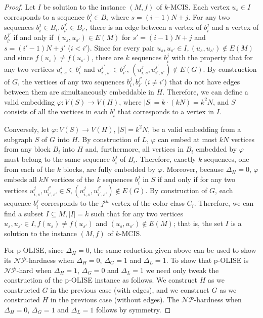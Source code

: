 \documentclass[11pt]{article}
\newcommand{\NP}{\mbox{$\mathcal{NP}$}}
\let\phi=\varphi
\begin{document}
\begin{proof}
Let $I$ be solution to the instance $(M, f)$ of \textsc{$k$-MCIS}. Each vertex $u_s \in I$ corresponds to a
sequence $b_i^j \in B_i$ where $s = (i-1)N+j$.
For any two sequences $b_i^j \in B_i, b_{i'}^{j'} \in B_{i'}$, there is an edge
between a vertex of $b_i^j$ and a vertex of $b_{i'}^{j'}$ if and only if
$(u_s, u_{s'}) \in E(M)$ for $s' = (i-1)N+j$ and $s = (i'-1)N+j'$ ($i < i'$). Since for
every pair $u_s, u_{s'} \in I, (u_s, u_{s'}) \notin E(M)$ and since
$f(u_s) \ne f(u_{s'})$, there are $k$ sequences $b_i^j$ with the property
that for any two vertices $u_{i,s}^j \in b_i^j$ and
$u_{i',s'}^{j'} \in b_{i'}^{j'}$, $(u_{i,s}^j,u_{i',s'}^{j'}) \notin E(G)$.
By construction of $G$, the vertices of any two sequences $b_i^j, b_{i'}^{j'}$
($i \ne i'$) that do not have edges between them are simultaneously embeddable in $H$. Therefore,
we can define a valid embedding $\phi : V(S) \to V(H)$, where $|S| = k \cdot (kN) =k^2N$, and $S$ consists of all the vertices in each $b_i^j$
that corresponds to a vertex in $I$.

Conversely, let $\phi: V(S) \to V(H)$, $|S| = k^2N$, be a valid embedding
from a subgraph $S$ of $G$ into $H$.  By construction of $L$, $\phi$ can embed at most $kN$
vertices from any block $B_i$ into $H$ and, furthermore, all vertices
in $B_i$ embedded by $\phi$ must belong to the same sequence $b_i^j$ of
$B_i$. Therefore, exactly $k$ sequences, one from each of the $k$ blocks, are fully embedded by $\phi$. Moreover, because $\Delta_H = 0$, $\phi$ embeds all $kN$ vertices of
the $k$ sequences $b_i^j$ in $S$ if and only if for any two vertices
$u_{i,s}^j, u_{i',s'}^{j'} \in S, (u_{i,s}^j, u_{i',s'}^{j'}) \notin E(G)$.
By construction of $G$, each sequence $b_i^j$ corresponds to the $j^{th}$
vertex of the color class $C_i$. Therefore, we can find a subset
$I \subseteq M, |I| = k$ such that for any two vertices $u_s, u_{s'} \in I,
f(u_s) \ne f(u_{s'})$ and $(u_s, u_{s'}) \notin E(M)$; that is, the set
$I$ is a solution to the instance $(M, f)$ of \textsc{$k$-MCIS}.

 For p-OLISE, since $\Delta_H =0$, the same reduction given above can be used to show its $\NP$-hardness when $\Delta_H=0$, $\Delta_G=1$ and $\Delta_L=1$.  To show that p-OLISE is \NP-hard when $\Delta_H=1$, $\Delta_G=0$ and $\Delta_L=1$ we need only tweak the construction of the p-OLISE instance as follows.  We construct $H$ as we constructed $G$ in the previous case (with edges), and we construct $G$ as we constructed $H$ in the previous case (without edges). The \NP-hardness when $\Delta_H=0$, $\Delta_G=1$ and $\Delta_L=1$ follows by symmetry.
\end{proof}
\end{document}
